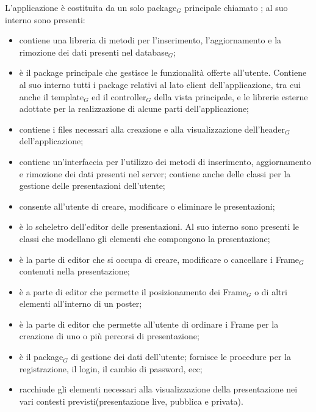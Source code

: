 L'applicazione è costituita da un solo package$_G$ principale chiamato ; al suo interno sono presenti:
\begin{itemize}
\item {} contiene una libreria di metodi per l'inserimento, l'aggiornamento e la rimozione dei dati presenti nel database$_G$;
\item {} è il package principale che gestisce le funzionalità offerte all'utente. Contiene al suo interno tutti i package relativi al lato client dell'applicazione, tra cui anche il template$_G$ ed il controller$_G$ della vista principale, e le librerie esterne adottate per la realizzazione di alcune parti dell'applicazione;
\item {} contiene i files necessari alla creazione e alla visualizzazione dell'header$_G$ dell'applicazione;
\item {} contiene un'interfaccia per l'utilizzo dei metodi di inserimento, aggiornamento e rimozione dei dati presenti nel server; contiene anche delle classi per la gestione delle presentazioni dell'utente;
\item {} consente all'utente di creare, modificare o eliminare le  presentazioni;
\item {} è lo scheletro dell'editor delle presentazioni. Al suo interno sono presenti le classi che modellano gli elementi che compongono la presentazione;
\item {} è la parte di editor che si occupa di creare, modificare o cancellare i Frame$_G$ contenuti nella presentazione;
\item {} è a parte di editor che permette il posizionamento dei Frame$_G$ o di altri elementi all'interno di un poster;
\item {} è la parte di editor che permette all'utente di ordinare i Frame per la creazione di uno o più percorsi di presentazione;
\item {} è il package$_G$ di gestione dei dati dell'utente; fornisce le procedure per la registrazione, il login, il cambio di password, ecc;
\item {} racchiude gli elementi necessari alla visualizzazione della presentazione nei vari contesti previsti(presentazione live, pubblica e privata).
\end{itemize}

\clearpage